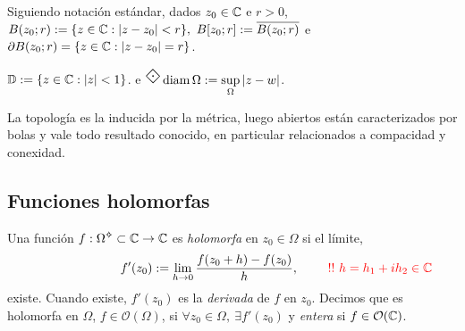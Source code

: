 
\newcommand{\D}{\mathbb{D}}
Siguiendo notación estándar, dados \(z_0 \in \mathbb{C}\) e \(r>0\), \(B(z_0; r) := \{z \in \mathbb{C} : |z- z_0| < r\}, \ B[z_0; r] := \overline{B(z_0; r)}\) e \( \partial B(z_0; r) = \{z \in \mathbb{C} : |z-z_0| = r\}\). 
\begin{definition}
    \centering \(\D := \{z \in \C : |z| <1\}\). \hspace{1cm } e \hspace{1cm}\(\rotatebox{45}{\large $\boxdot$}\operatorname{diam}\Omega := \displaystyle\sup_{\Omega} |z -w|\).
\end{definition}
La topología es la inducida por la métrica, luego abiertos están caracterizados por bolas y vale todo resultado conocido, en particular relacionados a compacidad y conexidad. 

\newcommand{\comentario}[1]{\textcolor{gray}{\(\rightarrow \) #1}}


\subsection*{Funciones holomorfas}

\newcommand{\ho}{\mathcal{O}}
\begin{definition}
    Una función \(f: \Omega\ab \subset \C \to \C\) es \emph{holomorfa} en \(z_0 \in \Omega\) si el límite,  
    \[\- \hspace{2.5cm}f'(z_0):= \lim_{h\to 0} \frac{f(z_0 + h) -f(z_0)}{h}, \ \ \textcolor{red}{ \ \ \ \ \ !! \ h = h_1 + i h_2 \in \C}\]%
    existe. Cuando existe, \(f'(z_0)\) es la  \emph{derivada} de \(f\) en \(z_0\). Decimos que es holomorfa en \(\Omega\), \(f \in \ho(\Omega)\), si \(\forall z_0 \in \Omega, \ \exists f'(z_0)\) y \emph{entera} si \(f \in \ho(\C)\). %
\end{definition}

